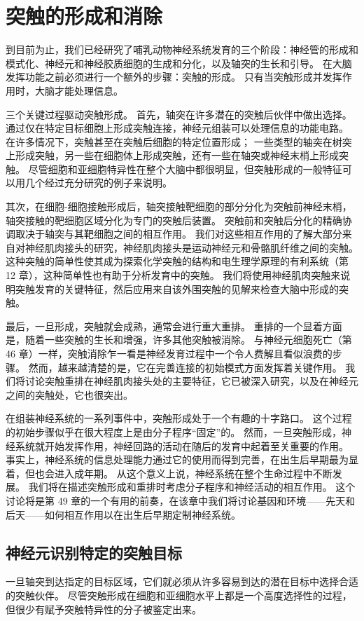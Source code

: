 \chapter{突触的形成和消除}

到目前为止，我们已经研究了哺乳动物神经系统发育的三个阶段：神经管的形成和模式化、神经元和神经胶质细胞的生成和分化，以及轴突的生长和引导。 在大脑发挥功能之前必须进行一个额外的步骤：突触的形成。 只有当突触形成并发挥作用时，大脑才能处理信息。

三个关键过程驱动突触形成。 首先，轴突在许多潜在的突触后伙伴中做出选择。 通过仅在特定目标细胞上形成突触连接，神经元组装可以处理信息的功能电路。 在许多情况下，突触甚至在突触后细胞的特定位置形成； 一些类型的轴突在树突上形成突触，另一些在细胞体上形成突触，还有一些在轴突或神经末梢上形成突触。 尽管细胞和亚细胞特异性在整个大脑中都很明显，但突触形成的一般特征可以用几个经过充分研究的例子来说明。

其次，在细胞-细胞接触形成后，轴突接触靶细胞的部分分化为突触前神经末梢，轴突接触的靶细胞区域分化为专门的突触后装置。 突触前和突触后分化的精确协调取决于轴突与其靶细胞之间的相互作用。 我们对这些相互作用的了解大部分来自对神经肌肉接头的研究，神经肌肉接头是运动神经元和骨骼肌纤维之间的突触。 这种突触的简单性使其成为探索化学突触的结构和电生理学原理的有利系统（第 12 章），这种简单性也有助于分析发育中的突触。 我们将使用神经肌肉突触来说明突触发育的关键特征，然后应用来自该外围突触的见解来检查大脑中形成的突触。

最后，一旦形成，突触就会成熟，通常会进行重大重排。 重排的一个显着方面是，随着一些突触的生长和增强，许多其他突触被消除。 与神经元细胞死亡（第 46 章）一样，突触消除乍一看是神经发育过程中一个令人费解且看似浪费的步骤。 然而，越来越清楚的是，它在完善连接的初始模式方面发挥着关键作用。 我们将讨论突触重排在神经肌肉接头处的主要特征，它已被深入研究，以及在神经元之间的突触处，它也很突出。

在组装神经系统的一系列事件中，突触形成处于一个有趣的十字路口。 这个过程的初始步骤似乎在很大程度上是由分子程序“固定”的。 然而，一旦突触形成，神经系统就开始发挥作用，神经回路的活动在随后的发育中起着至关重要的作用。 事实上，神经系统的信息处理能力通过它的使用而得到完善，在出生后早期最为显着，但也会进入成年期。 从这个意义上说，神经系统在整个生命过程中不断发展。 我们将在描述突触形成和重排时考虑分子程序和神经活动的相互作用。 这个讨论将是第 49 章的一个有用的前奏，在该章中我们将讨论基因和环境——先天和后天——如何相互作用以在出生后早期定制神经系统。


\section{神经元识别特定的突触目标}
一旦轴突到达指定的目标区域，它们就必须从许多容易到达的潜在目标中选择合适的突触伙伴。 尽管突触形成在细胞和亚细胞水平上都是一个高度选择性的过程，但很少有赋予突触特异性的分子被鉴定出来。

